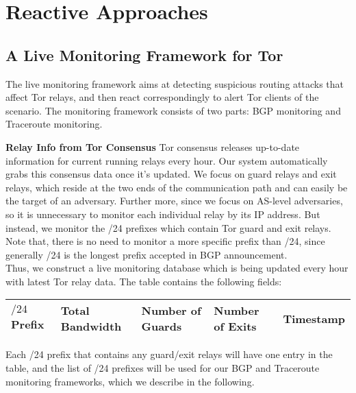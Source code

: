 \section{Reactive Approaches}

\subsection{A Live Monitoring Framework for Tor}
The live monitoring framework aims at detecting suspicious routing attacks that affect Tor relays, and then react correspondingly to alert Tor clients of the scenario. The monitoring framework consists of two parts: BGP monitoring and Traceroute monitoring.

{\bf Relay Info from Tor Consensus} Tor consensus releases up-to-date information for current running relays every hour. Our system automatically grabs this consensus data once it's updated. We focus on guard relays and exit relays, which reside at the two ends of the communication path and can easily be the target of an adversary. Further more, since we focus on AS-level adversaries, so it is unnecessary to monitor each individual relay by its IP address. But instead, we monitor the /24 prefixes which contain Tor guard and exit relays. Note that, there is no need to monitor a more specific prefix than /24, since generally /24 is the longest prefix accepted in BGP announcement. \\
Thus, we construct a live monitoring database which is being updated every hour with latest Tor relay data. The table contains the following fields:
\begin{center}
\begin{tabular}{ p{8mm} | p{1.4cm} | p{1.3cm} | p{1.3cm} | p{1.3cm}}
  \hline			
  $/24$ Prefix & Total Bandwidth & Number of Guards & Number of Exits & Timestamp \\
  \hline  
\end{tabular}
\label{tab:relayinfo}
\end{center}
Each /24 prefix that contains any guard/exit relays will have one entry in the table, and the list of /24 prefixes will be used for our BGP and Traceroute monitoring frameworks, which we describe in the following. 

